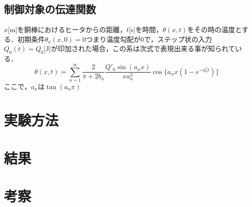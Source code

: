 \documentclass[11pt,a4paper]{jsarticle}
\begin{document}
  \subsection{制御対象の伝達関数}
  $x$[m]を銅棒におけるヒータからの距離，$t$[s]を時間，$\theta(x,t)$をその時の温度とする．初期条件$\theta_x(x,0) = 0$つまり温度勾配が$0$で，ステップ状の入力$Q_0(t) = Q_0$[J]が印加された場合，この系は次式で表現出来る事が知られている．
  \begin{equation}
   \theta(x,t) = \sum_{n = 1}^{\infty} 
    \frac{2}{\pi + 2b_n} 
    \frac{Q'_0 \sin(a_n x)}{x a_n^3} 
    \cos \{ a_n x(1-e^{-a_n^2 t}) \}
  \end{equation}
ここで，$a_n$は$\tan(a_n \pi)$
\section{実験方法}
\section{結果}
\section{考察}
\end{document}

